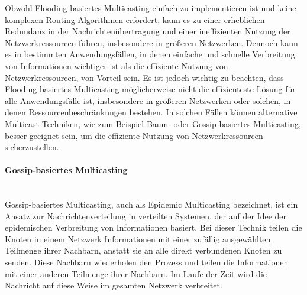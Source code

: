 \documentclass[../vs-script-first-v01.tex]{subfiles}
\begin{document}
Obwohl Flooding-basiertes Multicasting einfach zu implementieren ist und keine komplexen Routing-Algorithmen erfordert, kann es zu einer erheblichen Redundanz in der Nachrichtenübertragung und einer ineffizienten Nutzung der Netzwerkressourcen führen, insbesondere in größeren Netzwerken. Dennoch kann es in bestimmten Anwendungsfällen, in denen einfache und schnelle Verbreitung von Informationen wichtiger ist als die effiziente Nutzung von Netzwerkressourcen, von Vorteil sein.
Es ist jedoch wichtig zu beachten, dass Flooding-basiertes Multicasting möglicherweise nicht die effizienteste Lösung für alle Anwendungsfälle ist, insbesondere in größeren Netzwerken oder solchen, in denen Ressourcenbeschränkungen bestehen. In solchen Fällen können alternative Multicast-Techniken, wie zum Beispiel Baum- oder Gossip-basiertes Multicasting, besser geeignet sein, um die effiziente Nutzung von Netzwerkressourcen sicherzustellen.
\paragraph{Gossip-basiertes Multicasting}\mbox{}\\
Gossip-basiertes Multicasting, auch als Epidemic Multicasting bezeichnet, ist ein Ansatz zur Nachrichtenverteilung in verteilten Systemen, der auf der Idee der epidemischen Verbreitung von Informationen basiert. Bei dieser Technik teilen die Knoten in einem Netzwerk Informationen mit einer zufällig ausgewählten Teilmenge ihrer Nachbarn, anstatt sie an alle direkt verbundenen Knoten zu senden. Diese Nachbarn wiederholen den Prozess und teilen die Informationen mit einer anderen Teilmenge ihrer Nachbarn. Im Laufe der Zeit wird die Nachricht auf diese Weise im gesamten Netzwerk verbreitet.
\end{document}
